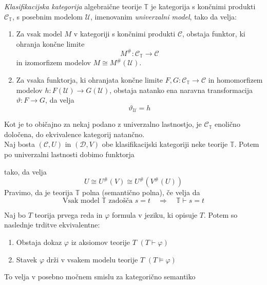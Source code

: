 \begin{definicija}
\emph{Klasifikacijska kategorija} algebraične teorije $\mathbb{T}$ je kategorija s končnimi produkti $\mathcal{C}_\mathbb{T}$, s posebnim modelom $\mathcal{U}$, imenovanim \emph{univerzalni model}, tako da velja:
\begin{enumerate}
\item Za vsak model $M$ v kategoriji s končnimi produkti $\mathcal{C}$, obstaja funktor, ki ohranja končne limite $$M^{\#} : \mathcal{C}_\mathbb{T} \to \mathcal{C}$$
in izomorfizem modelov $M \cong M^{\#}(\mathcal{U})$.
%
\item Za vsaka funktorja, ki ohranjata končne limite $F,G : \mathcal{C}_\mathbb{T} \to \mathcal{C}$ in homomorfizem modelov $h: F(\mathcal{U}) \to G(\mathcal{U})$, obstaja natanko ena naravna transformacija $\vartheta : F \to G$, da velja
$$\vartheta_\mathcal{U} = h$$
\end{enumerate}
\end{definicija}
Kot je to običajno za nekaj podano z univerzalno lastnostjo, je $\mathcal{C}_\mathbb{T}$ enolično določena, do ekvivalence kategorij natančno. \\
\vspace{1cm}
%
Naj bosta $(\mathcal{C}, U)$ in $(\mathcal{D}, V)$ obe klasifikacijski kategoriji neke teorije $\mathbb{T}$. Potem po univerzalni lastnosti dobimo funktorja
\begin{center}
\end{center}
tako, da velja
$$U \cong U^{\#}(V) \cong U^{\#}(V^{\#}(U))$$
Pravimo, da je teorija $\mathbb{T}$ polna (semantično polna), če velja da
$$\text{Vsak model } \mathbb{T} \text{ zadošča }s=t \quad \Longrightarrow \quad \mathbb{T} \vdash s = t$$
\begin{izrek}[Gödel]
Naj bo $T$ teorija prvega reda in $\varphi$ formula v jeziku, ki opisuje $T$. Potem so naslednje trditve ekvivalentne:
\begin{enumerate}
\item Obstaja dokaz $\varphi$ iz aksiomov teorije $T$ $(T \vdash \varphi)$
\item Stavek $\varphi$ drži v vsakem modelu teorije $T$ $(T \models \varphi)$
\end{enumerate}
\end{izrek}
To velja v posebno močnem smislu za kategorično semantiko
